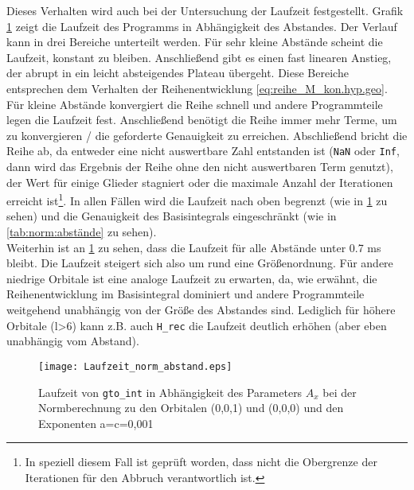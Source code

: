 Dieses Verhalten wird auch bei der Untersuchung der 
Laufzeit festgestellt. Grafik 
\ref{pic:test_norm_abstand_laufzeit} zeigt die Laufzeit 
des Programms in Abhängigkeit des Abstandes. Der 
Verlauf kann in drei Bereiche unterteilt werden. Für 
sehr kleine Abstände scheint die Laufzeit, konstant zu 
bleiben. Anschließend gibt es einen fast linearen 
Anstieg, der abrupt in ein leicht absteigendes Plateau 
übergeht. Diese Bereiche entsprechen dem Verhalten der 
Reihenentwicklung \ref{eq:reihe_M_kon.hyp.geo}. Für 
kleine Abstände konvergiert die Reihe schnell und 
andere Programmteile legen die Laufzeit fest. 
Anschließend benötigt die Reihe immer mehr Terme, um zu 
konvergieren / die geforderte Genauigkeit zu erreichen. 
Abschließend bricht die Reihe ab, da entweder eine nicht 
auswertbare Zahl entstanden ist (\texttt{NaN} oder \texttt{Inf}, dann wird das 
Ergebnis der Reihe 
ohne den nicht auswertbaren Term genutzt), der 
Wert für einige Glieder stagniert oder die maximale 
Anzahl der Iterationen erreicht ist\footnote{In 
speziell diesem Fall ist geprüft worden, dass nicht die 
Obergrenze der Iterationen für den Abbruch 
verantwortlich ist.}. In allen Fällen wird die Laufzeit 
nach oben begrenzt (wie in 
\ref{pic:test_norm_abstand_laufzeit} zu sehen) und die 
Genauigkeit des Basisintegrals eingeschränkt (wie in 
\ref{tab:norm:abstände} zu sehen).\\
Weiterhin ist an \ref{pic:test_norm_abstand_laufzeit} 
zu sehen, dass die Laufzeit für alle Abstände unter 0.7 
ms bleibt. Die Laufzeit steigert sich also um rund eine Größenordnung. Für 
andere niedrige Orbitale ist 
eine analoge Laufzeit zu erwarten, da, 
wie erwähnt, die Reihenentwicklung im Basisintegral dominiert und 
andere Programmteile weitgehend unabhängig von der 
Größe des Abstandes sind. Lediglich für höhere Orbitale (l>6) kann z.B. auch 
\texttt{H\_rec} die Laufzeit deutlich erhöhen (aber eben unabhängig vom 
Abstand).  
%
\begin{figure}[t] \centering
	\texttt{[image: Laufzeit\_norm\_abstand.eps]}
	\caption{Laufzeit von \texttt{gto\_int} in Abhängigkeit des 
	Parameters $A_x$ bei der Normberechnung zu den 
	Orbitalen (0,0,1) und (0,0,0) und den Exponenten 
	a=c=0,001}
	\label{pic:test_norm_abstand_laufzeit} 
\end{figure}
%

%
%
%
